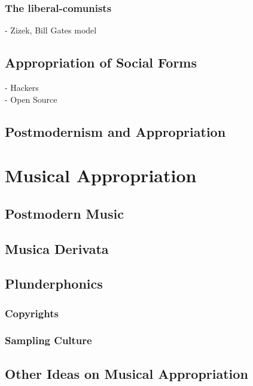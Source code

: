 \subsubsection{The liberal-comunists} 

- Zizek, Bill Gates model \\

\subsection {Appropriation of Social Forms}

- Hackers \\
- Open Source \\

\subsection {Postmodernism and Appropriation}

\section{Musical Appropriation}

\subsection{Postmodern Music}

\subsection{Musica Derivata}

\subsection{Plunderphonics}

\subsubsection{Copyrights}

\subsubsection{Sampling Culture}

\subsection{Other Ideas on Musical Appropriation}

\label{ch:approp}